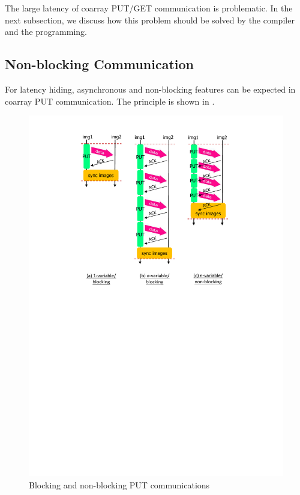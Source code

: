 The large latency of coarray PUT/GET communication is problematic.
In the next subsection, we discuss how this problem should be solved 
by the compiler and the programming.


\subsection{Non-blocking Communication}

For latency hiding, asynchronous and non-blocking features can be expected 
in coarray PUT communication.
The principle is shown in .

\begin{figure}
  \begin{center}
    \mbox{\includegraphics[trim=43mm 144mm 43mm 3mm, scale=0.6,clip]{figs/nonblock-fig-r2.pdf}}
    \caption{Blocking and non-blocking PUT communications}\label{fig:nonblock-fig}
  \end{center}
\end{figure}

